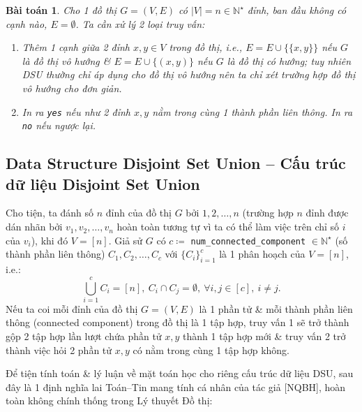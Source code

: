 \documentclass{article}
\newtheorem{baitoan}{Bài toán}
\begin{document}
\begin{baitoan}
    \label{prob: query connectedness}
    Cho 1 đồ thị $G = (V,E)$ có $|V| = n\in\mathbb{N}^\star$ đỉnh, ban đầu không có cạnh nào, $E = \emptyset$. Ta cần xử lý 2 loại truy vấn:
    \begin{enumerate}
        \item Thêm 1 cạnh giữa 2 đỉnh $x,y\in V$ trong đồ thị, i.e., $E = E\cup\{\{x,y\}\}$ nếu $G$ là đồ thị vô hướng \& $E = E\cup\{(x,y)\}$ nếu $G$ là đồ thị có hướng; tuy nhiên DSU thường chỉ áp dụng cho đồ thị vô hướng nên ta chỉ xét trường hợp đồ thị vô hướng cho đơn giản.
        \item In ra {\tt yes} nếu như 2 đỉnh $x,y$ nằm trong cùng 1 thành phần liên thông. In ra {\tt no} nếu ngược lại.
    \end{enumerate}
\end{baitoan}


\subsection{Data Structure Disjoint Set Union -- Cấu trúc dữ liệu Disjoint Set Union}
Cho tiện, ta đánh số $n$ đỉnh của đồ thị $G$ bởi $1,2,\ldots,n$ (trường hợp $n$ đỉnh được dán nhãn bởi $v_1,v_2,\ldots,v_n$ hoàn toàn tương tự vì ta có thể làm việc trên chỉ số $i$ của $v_i$), khi đó $V = [n]$. Giả sử $G$ có $c\coloneqq$ \verb|num_connected_component| $\in\mathbb{N}^\star$ (số thành phần liên thông) $C_1,C_2,\ldots,C_c$ với $\{C_i\}_{i=1}^c$ là 1 phân hoạch của $V = [n]$, i.e.:
\begin{equation*}
    \bigcup_{i=1}^c C_i = [n],\ C_i\cap C_j = \emptyset,\ \forall i,j\in[c],\ i\ne j.
\end{equation*}
Nếu ta coi mỗi đỉnh của đồ thị $G = (V,E)$ là 1 phần tử \& mỗi thành phần liên thông (connected component) trong đồ thị là 1 tập hợp, truy vấn 1 sẽ trở thành gộp 2 tập hợp lần lượt chứa phần tử $x,y$ thành 1 tập hợp mới \& truy vấn 2 trở thành việc hỏi 2 phần tử $x,y$ có nằm trong cùng 1 tập hợp không.

Để tiện tính toán \& lý luận về mặt toán học cho riêng cấu trúc dữ liệu DSU, sau đây là 1 định nghĩa lai Toán--Tin mang tính cá nhân của tác giả [NQBH], hoàn toàn không chính thống trong Lý thuyết Đồ thị:
\end{document}
